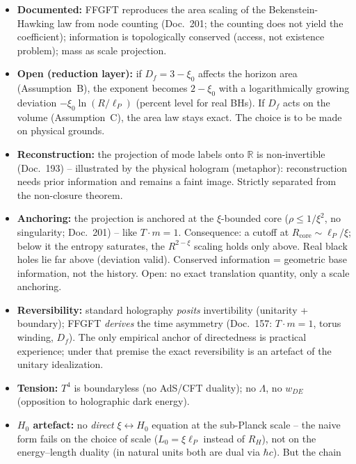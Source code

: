\begin{itemize}
  \item \textbf{Documented:} FFGFT reproduces the area scaling of the
        Bekenstein-Hawking law from node counting (Doc.~201; the counting
        does not yield the coefficient); information is topologically conserved
        (access, not existence problem); mass as scale projection.
  \item \textbf{Open (reduction layer):} if $D_f = 3-\xi_0$ affects the
        horizon area (Assumption~B), the exponent becomes $2-\xi_0$ with a
        logarithmically growing deviation $-\xi_0\ln(R/\ell_P)$ (percent level
        for real BHs). If $D_f$ acts on the volume (Assumption~C), the area
        law stays exact. The choice is to be made on physical grounds.
  \item \textbf{Reconstruction:} the projection of mode labels onto
        $\mathbb{R}$ is non-invertible (Doc.~193) -- illustrated by the
        physical hologram (metaphor): reconstruction needs prior information
        and remains a faint image. Strictly separated from the non-closure
        theorem.
  \item \textbf{Anchoring:} the projection is anchored at the
        $\xi$-bounded core ($\rho \le 1/\xi^2$, no singularity; Doc.~201) --
        like $T\cdot m=1$. Consequence: a cutoff at $R_\text{core}\sim\ell_P/\xi$;
        below it the entropy saturates, the $R^{2-\xi}$ scaling holds only
        above. Real black holes lie far above (deviation valid). Conserved
        information = geometric base information, not the history. Open: no
        exact translation quantity, only a scale anchoring.
  \item \textbf{Reversibility:} standard holography \emph{posits}
        invertibility (unitarity + boundary); FFGFT \emph{derives} the time
        asymmetry (Doc.~157: $T\cdot m=1$, torus winding, $D_f$). The only
        empirical anchor of directedness is practical experience; under that
        premise the exact reversibility is an artefact of the unitary
        idealization.
  \item \textbf{Tension:} $T^4$ is boundaryless (no AdS/CFT duality); no
        $\Lambda$, no $w_{DE}$ (opposition to holographic dark energy).
  \item \textbf{$H_0$ artefact:} no \emph{direct} $\xi\leftrightarrow H_0$
        equation at the sub-Planck scale -- the naive form fails on the choice
        of scale ($L_0=\xi\ell_P$ instead of $R_H$), not on the energy--length
        duality (in natural units both are dual via $\hbar c$). But the chain

\end{itemize}
